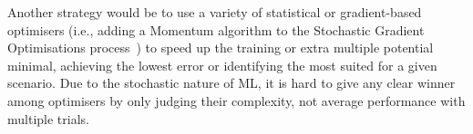 Another strategy would be to use a variety of statistical or gradient-based optimisers (i.e., adding a Momentum algorithm to the Stochastic Gradient Optimisations process~\cite{xiao_accurate_2019}) to speed up the training or extra multiple potential minimal, achieving the lowest error or identifying the most suited for a given scenario.
Due to the stochastic nature of ML, it is hard to give any clear winner among optimisers by only judging their complexity, not average performance with multiple trials.
